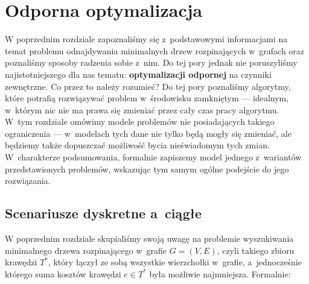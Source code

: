 \chapter{Odporna optymalizacja}\label{ch:minmax}
\thispagestyle{chapterBeginStyle}





W poprzednim rozdziale zapoznaliśmy się z~podstawowymi informacjami na temat problemu odnajdywania minimalnych drzew rozpinających w~grafach oraz poznaliśmy sposoby radzenia sobie z~nim.
Do tej pory jednak nie poruszyliśmy najistotniejszego dla nas tematu: \textbf{optymalizacji odpornej} na czynniki zewnętrzne.
Co przez to należy rozumieć?
Do tej pory poznaliśmy algorytmy, które potrafią rozwiązywać problem w~środowisku zamkniętym --- idealnym, w~którym nic nie ma prawa się zmieniać przez cały czas pracy algorytmu.
W~tym rozdziale omówimy modele problemów nie posiadających takiego ograniczenia --- w~modelach tych dane nie tylko będą mogły się zmieniać, ale będziemy także dopuszczać możliwość bycia nieświadomym tych zmian.
W~charakterze podsumowania, formalnie zapiszemy model jednego z~wariantów przedstawionych problemów, wskazując tym samym ogólne podejście do jego rozwiązania.




\section{Scenariusze dyskretne a~ciągłe}




W poprzednim rozdziale skupialiśmy swoją uwagę na problemie wyszukiwania minimalnego drzewa rozpinającego w~grafie $G = \left( V, E \right)$, czyli takiego zbioru krawędzi $T^{\ast}$, który łączył ze sobą wszystkie wierzchołki w~grafie, a~jednocześnie którego suma kosztów krawędzi $e \in T^{\ast}$ była możliwie najmniejsza.
Formalnie:


